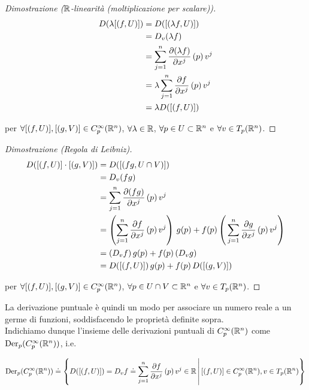 \begin{proof}[Dimostrazione ($ \mathbb{R} $-linearità (moltiplicazione per scalare))]
	\begin{align}
		\begin{split}
			D (\lambda [(f,U)]) &= D ([(\lambda f,U)])\\
			&= D_{v} (\lambda f)\\
			&= \sum_{j=1}^{n} \pdv{(\lambda f)}{x^{j}} \, (p) \, v^{j}\\
			&= \lambda \sum_{j=1}^{n} \pdv{f}{x^{j}} \, (p) \, v^{j}\\
			&= \lambda D ([(f,U)])
		\end{split}
	\end{align}

	per $ \forall [(f,U)], [(g,V)] \in C_{p}^{\infty}(\mathbb{R}^{n}) $, $ \forall \lambda \in \mathbb{R} $, $ \forall p \in U \subset \mathbb{R}^{n} $ e $ \forall v \in T_{p} (\mathbb{R}^{n}) $.
\end{proof}

\begin{proof}[Dimostrazione (Regola di Leibniz)]
	\begin{align}
		\begin{split}
			D ([(f,U)] \cdot [(g,V)]) &= D ([(f g,U \cap V)])\\
			&= D_{v} (f g)\\
			&= \sum_{j=1}^{n} \pdv{(f g)}{x^{j}} \, (p) \, v^{j}\\
			&= \left( \sum_{j=1}^{n} \pdv{f}{x^{j}} \, (p) \, v^{j} \right) \, g(p) + f(p) \left( \, \sum_{j=1}^{n} \pdv{g}{x^{j}} \, (p) \, v^{j} \right)\\
			&= (D_{v} f) \, g(p) + f(p) \, (D_{v} g)\\
			&= D ([(f,U)]) \, g(p) + f(p) \, D ([(g,V)])
		\end{split}
	\end{align}

	per $ \forall [(f,U)], [(g,V)] \in C_{p}^{\infty}(\mathbb{R}^{n}) $, $ \forall p \in U \cap V \subset \mathbb{R}^{n} $ e $ \forall v \in T_{p} (\mathbb{R}^{n}) $.
\end{proof}

La derivazione puntuale è quindi un modo per associare un numero reale a un germe di funzioni, soddisfacendo le proprietà definite sopra.\\
Indichiamo dunque l'insieme delle derivazioni puntuali di $ C_{p}^{\infty}(\mathbb{R}^{n}) $ come $ \operatorname{Der}_{p}(C_{p}^{\infty}(\mathbb{R}^{n})) $, i.e.

\begin{equation}
	\operatorname{Der}_{p}(C_{p}^{\infty}(\mathbb{R}^{n})) \doteq \left\{ D ([(f,U)]) = D_{v} f \doteq \sum_{j=1}^{n} \pdv{f}{x^{j}} \, (p) \, v^{j} \in \mathbb{R} \, \middle| \, [(f,U)] \in C_{p}^{\infty}(\mathbb{R}^{n}), v \in T_{p} (\mathbb{R}^{n}) \right\}
\end{equation}

